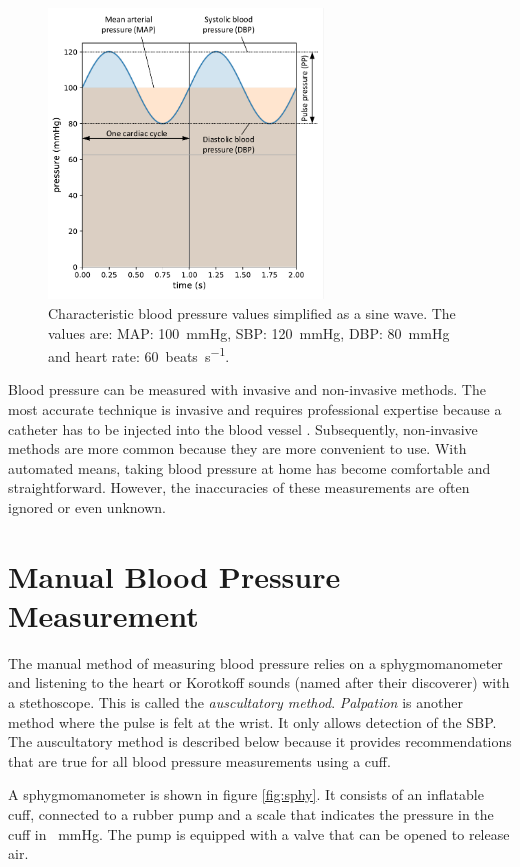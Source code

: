 \begin{figure}[ht]
\centering
\includegraphics[width=0.65\textwidth]{figures/MAP.pdf}
\caption{Characteristic blood pressure values simplified as a sine wave. The values are: MAP: \SI{100}{\mmHg}, SBP: \SI{120}{\mmHg}, DBP: \SI{80}{\mmHg} and heart rate: \SI{60}{beats\per\second}.}
\label{fig:BP}
\end{figure}

Blood pressure can be measured with invasive and non-invasive methods. The most accurate technique is invasive and requires professional expertise because a catheter has to be injected into the blood vessel \citep{Boron2012}. Subsequently, non-invasive methods are more common because they are more convenient to use. With automated means, taking blood pressure at home has become comfortable and straightforward. However, the inaccuracies of these measurements are often ignored or even unknown.

\section{Manual Blood Pressure Measurement}
The manual method of measuring blood pressure relies on a sphygmomanometer and listening to the heart or Korotkoff sounds (named after their discoverer) with a stethoscope. This is called the \emph{auscultatory method}. \emph{Palpation} is another method where the pulse is felt at the wrist. It only allows detection of the SBP. The auscultatory method is described below because it provides recommendations that are true for all blood pressure measurements using a cuff.

A sphygmomanometer is shown in figure \ref{fig:sphy}. It consists of an inflatable cuff, connected to a rubber pump and a scale that indicates the pressure in the cuff in \SI{}{\mmHg}. The pump is equipped with a valve that can be opened to release air.

